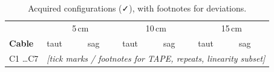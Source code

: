 \begin{table}[H]
  \centering
  \begin{tabularx}{\textwidth}{l *{6}{X}}
    \toprule
    & \multicolumn{2}{c}{5\,cm} & \multicolumn{2}{c}{10\,cm}
      & \multicolumn{2}{c}{15\,cm} \\
    \textbf{Cable} & taut & sag & taut & sag & taut & sag \\
    \midrule
    C1 \ldots C7 & \multicolumn{6}{c}{\textit{[tick marks / footnotes for
      TAPE, repeats, linearity subset]}} \\
    \bottomrule
  \end{tabularx}
  \caption[Configuration matrix]{Acquired configurations (✓), with
    footnotes for deviations.}
  \label{tab:methods:matrix}
\end{table}


